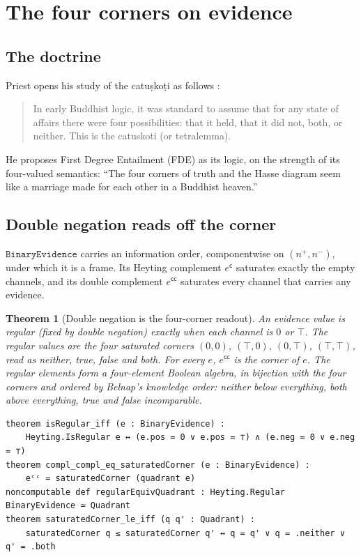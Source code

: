 \documentclass[11pt]{article}
\newcommand{\code}[1]{\texttt{#1}}
\newcommand{\BE}{\code{BinaryEvidence}}
\theoremstyle{plain}
\newtheorem{theorem}{Theorem}[section]
\theoremstyle{definition}
\begin{document}
\section{The four corners on evidence}
\label{sec:corners}

\subsection{The doctrine}

Priest opens his study of the catuṣkoṭi as follows \cite{Priest2010}:

\begin{quote}
In early Buddhist logic, it was standard to assume that for any state of affairs there were
four possibilities: that it held, that it did not, both, or neither. This is the catuskoti
(or tetralemma).
\end{quote}

\noindent He proposes First Degree Entailment (FDE) as its logic, on the strength of its
four-valued semantics: ``The four corners of truth and the Hasse diagram seem like a
marriage made for each other in a Buddhist heaven.''

\subsection{Double negation reads off the corner}

$\BE$ carries an information order, componentwise on $(n^+, n^-)$, under which it is a
frame. Its Heyting complement $e^{\mathsf c}$ saturates exactly the empty channels, and its
double complement $e^{\mathsf c\mathsf c}$ saturates every channel that carries any evidence.

\begin{theorem}[Double negation is the four-corner readout]
An evidence value is regular (fixed by double negation) exactly when each channel is $0$
or $\top$. The regular values are the four saturated corners $(0,0)$, $(\top,0)$,
$(0,\top)$, $(\top,\top)$, read as neither, true, false and both. For every $e$,
$e^{\mathsf c\mathsf c}$ is the corner of $e$. The regular elements form a four-element
Boolean algebra, in bijection with the four corners and ordered by Belnap's knowledge order:
\emph{neither} below everything, \emph{both} above everything, \emph{true} and \emph{false}
incomparable.
\end{theorem}

\begin{lstlisting}
theorem isRegular_iff (e : BinaryEvidence) :
    Heyting.IsRegular e ↔ (e.pos = 0 ∨ e.pos = ⊤) ∧ (e.neg = 0 ∨ e.neg = ⊤)
theorem compl_compl_eq_saturatedCorner (e : BinaryEvidence) :
    eᶜᶜ = saturatedCorner (quadrant e)
noncomputable def regularEquivQuadrant : Heyting.Regular BinaryEvidence ≃ Quadrant
theorem saturatedCorner_le_iff (q q' : Quadrant) :
    saturatedCorner q ≤ saturatedCorner q' ↔ q = q' ∨ q = .neither ∨ q' = .both
\end{lstlisting}
\end{document}

